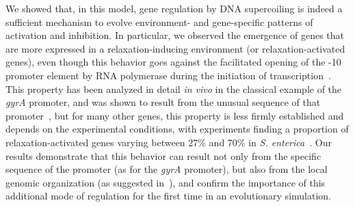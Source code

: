 We showed that, in this model, gene regulation by DNA supercoiling is indeed a sufficient mechanism to evolve environment- and gene-specific patterns of activation and inhibition.
In particular, we observed the emergence of genes that are more expressed in a relaxation-inducing environment (or relaxation-activated genes), even though this behavior goes against the facilitated opening of the -10 promoter element by RNA polymerase during the initiation of transcription~\citep{forquet2021}.
This property has been analyzed in detail \emph{in vivo} in the classical example of the \emph{gyrA} promoter, and was shown to result from the unusual sequence of that promoter~\citep{menzel1987}, but for many other genes, this property is less firmly established and depends on the experimental conditions, with experiments finding a proportion of relaxation-activated genes varying between 27\% and 70\% in \emph{S. enterica}~\citep{pineau2022a}.
Our results demonstrate that this behavior can result not only from the specific sequence of the promoter (as for the \emph{gyrA} promoter), but also from the local genomic organization (as suggested in~\cite{elhoudaigui2019}), and confirm the importance of this additional mode of regulation for the first time in an evolutionary simulation.

